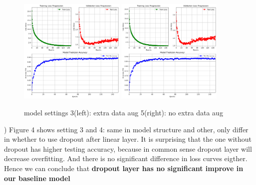 \documentclass{article}
\begin{document}
\begin{figure}[hbtp]
  \centering
  \includegraphics[width=0.45\textwidth]{fig/train_result_3.png} %
  \includegraphics[width=0.45\textwidth]{fig/train_result_5.png} %
  \caption{model settings 3(left): extra data aug 5(right): no extra data aug} %
  \label{fig:curve} %
\end{figure}

) Figure 4 shows setting 3 and 4: same in model structure and other, only differ in whether to use dropout after linear layer. It is surprising that the one without dropout has higher testing accuracy, because in common sense dropout layer will decrease overfitting. And there is no significant difference in loss curves eigther. Hence we can conclude that \textbf{dropout layer has no significant improve in our baseline model}\\
\end{document}

